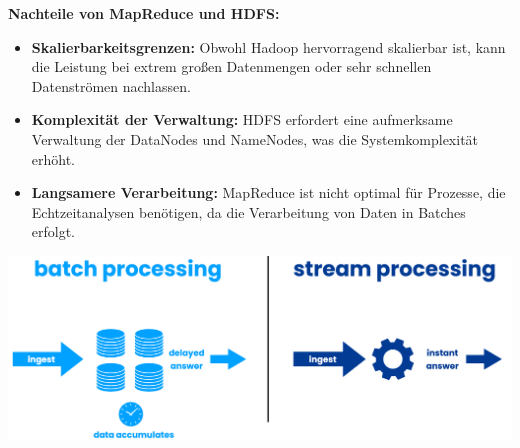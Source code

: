 \documentclass[9pt]{innovativeinnovation-cheatsheet}
\begin{document}
\begin{multicols*}{4}
\textbf{Nachteile von MapReduce und HDFS:}
\begin{itemize}
	\item \textbf{Skalierbarkeitsgrenzen:} Obwohl Hadoop hervorragend skalierbar ist, kann die Leistung bei extrem großen Datenmengen oder sehr schnellen Datenströmen nachlassen.
	\item \textbf{Komplexität der Verwaltung:} HDFS erfordert eine aufmerksame Verwaltung der DataNodes und NameNodes, was die Systemkomplexität erhöht.
	\item \textbf{Langsamere Verarbeitung:} MapReduce ist nicht optimal für Prozesse, die Echtzeitanalysen benötigen, da die Verarbeitung von Daten in Batches erfolgt.
\end{itemize}



\begin{center}
	\includegraphics[width=0.99\linewidth]{batch_stream}
\end{center}










	
\end{multicols*}
\end{document}
